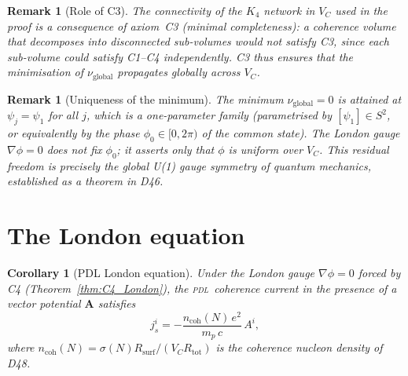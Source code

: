 \documentclass[12pt,a4paper]{article}
\newtheorem{corollary}[theorem]{Corollary}
\newtheorem{remark}[theorem]{Remark}
\newcommand{\Kfour}{K_4}
\newcommand{\PDL}{\textsc{pdl}}
\newcommand{\Rsurf}{R_{\mathrm{surf}}}
\newcommand{\Rtot}{R_{\mathrm{tot}}}
\newcommand{\VC}{V_C}
\newcommand{\sig}{\sigma}
\newcommand{\ncoh}{n_{\mathrm{coh}}}
\newcommand{\Avec}{\mathbf{A}}
\begin{document}
\begin{remark}[Role of C3]
The connectivity of the $\Kfour$ network in $V_C$ used in the proof is a consequence of axiom~C3 (minimal completeness): a coherence volume that decomposes into disconnected sub-volumes would not satisfy C3, since each sub-volume could satisfy C1--C4 independently. C3 thus ensures that the minimisation of $\nu_{\mathrm{global}}$ propagates globally across $V_C$.
\end{remark}

\begin{remark}[Uniqueness of the minimum]
The minimum $\nu_{\mathrm{global}} = 0$ is attained at $\psi_j = \psi_1$ for all $j$, which is a one-parameter family (parametrised by $[\psi_1] \in S^2$, or equivalently by the phase $\phi_0 \in [0, 2\pi)$ of the common state). The London gauge $\nabla\phi = 0$ does not fix $\phi_0$; it asserts only that $\phi$ is uniform over $V_C$. This residual freedom is precisely the global U(1) gauge symmetry of quantum mechanics, established as a theorem in D46.
\end{remark}

\section{The London equation}
\label{sec:London_equation}

\begin{corollary}[PDL London equation]
\label{cor:London}
Under the London gauge $\nabla\phi = 0$ forced by C4 (Theorem~\ref{thm:C4_London}), the \PDL\ coherence current in the presence of a vector potential $\Avec$ satisfies
\begin{equation}
\boxed{j^i_s = -\frac{\ncoh(N)\,e^2}{m_p\,c}\,A^i,}
\label{eq:London_corollary}
\end{equation}
where $\ncoh(N) = \sig(N)\Rsurf/(\VC\Rtot)$ is the coherence nucleon density of D48.
\end{corollary}
\end{document}

